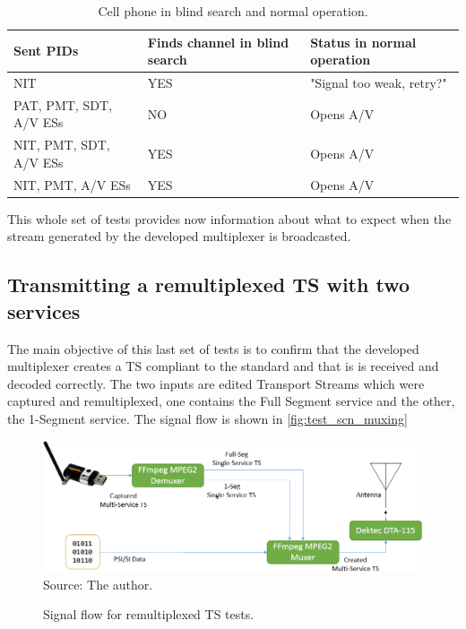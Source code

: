 \documentclass[
	12pt,				%
	openright,			%
	twoside,			%
	a4paper,			%
	brazil,
	french,				%
	english
	]{abntex2}
\begin{document}
\begin{table}
    \caption {Cell phone in blind search and normal operation.}
    \begin{tabular}{|l|l|l|}
    \hline
    Sent PIDs              & Finds channel in blind search & Status in normal operation \\ \hline
    NIT                    & YES                           & "Signal too weak, retry?"  \\ \hline
    PAT, PMT, SDT, A/V ESs & NO                            & Opens A/V                  \\ \hline
    NIT, PMT, SDT, A/V ESs & YES                           & Opens A/V                  \\ \hline
    NIT, PMT, A/V ESs      & YES                           & Opens A/V                  \\ \hline
    \end{tabular}
	\label{tab_cell}
\end{table}

This whole set of tests provides now information about what to expect when the stream generated by the developed multiplexer is broadcasted.

\subsection{Transmitting a remultiplexed TS with two services}

The main objective of this last set of tests is to confirm that the developed multiplexer creates a TS compliant to the standard and that is is received and decoded correctly. The two inputs are edited Transport Streams which were captured and remultiplexed, one contains the Full Segment service and the other, the 1-Segment service. The signal flow is shown in \autoref{fig:test_scn_muxing}

\begin{figure}[!h]
\centering
\caption{Signal flow for remultiplexed TS tests.}
\includegraphics[width=0.8\linewidth]{figuras/test_scn_muxing.png}
\\Source: The author.
\label{fig:test_scn_muxing}
\end{figure}
\end{document}
